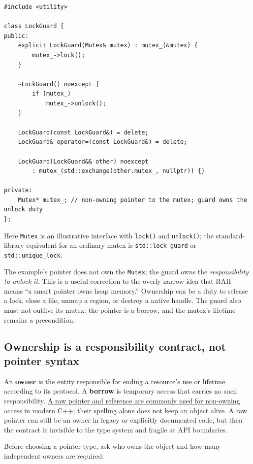 \begin{verbatim}
#include <utility>

class LockGuard {
public:
    explicit LockGuard(Mutex& mutex) : mutex_(&mutex) {
        mutex_->lock();
    }

    ~LockGuard() noexcept {
        if (mutex_)
            mutex_->unlock();
    }

    LockGuard(const LockGuard&) = delete;
    LockGuard& operator=(const LockGuard&) = delete;

    LockGuard(LockGuard&& other) noexcept
        : mutex_(std::exchange(other.mutex_, nullptr)) {}

private:
    Mutex* mutex_; // non-owning pointer to the mutex; guard owns the unlock duty
};
\end{verbatim}

Here \texttt{Mutex} is an illustrative interface with \texttt{lock()} and \texttt{unlock()}; the standard-library equivalent for an ordinary mutex is \texttt{std::lock\_guard} or \texttt{std::unique\_lock}.

The example's pointer does not own the \texttt{Mutex}; the guard owns the \emph{responsibility to unlock it}. This is a useful correction to the overly narrow idea that RAII means ``a smart pointer owns heap memory.'' Ownership can be a duty to release a lock, close a file, unmap a region, or destroy a native handle. The guard also must not outlive its mutex: the pointer is a borrow, and the mutex's lifetime remains a precondition.

\subsection{Ownership is a responsibility contract, not pointer syntax}\label{05-engine-i-ch004-ownership-is-a-responsibility-contract-not-pointer-syntax}

An \textbf{owner} is the entity responsible for ending a resource's use or lifetime according to its protocol. A \textbf{borrow} is temporary access that carries no such responsibility. \hyperref[appendix-d52e4486f527]{A raw pointer and reference are commonly used for non-owning access} in modern C++; their spelling alone does not keep an object alive. A raw pointer can still be an owner in legacy or explicitly documented code, but then the contract is invisible to the type system and fragile at API boundaries.

Before choosing a pointer type, ask who owns the object and how many independent owners are required:

